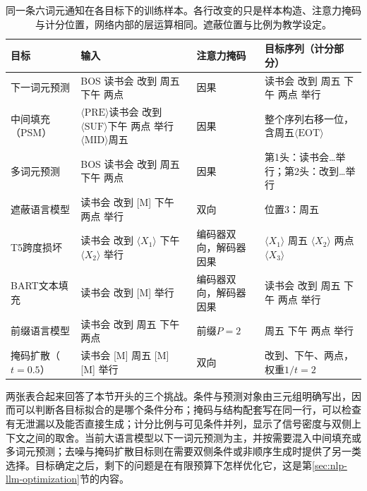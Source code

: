 \begin{table}[htbp]
 \small
 \begin{tabularx}{\linewidth}{@{}p{20mm}p{55mm}p{22mm}X@{}}
  \toprule
  目标 & 输入 & 注意力掩码 & 目标序列（计分部分）\\
  \midrule
  下一词元预测 & BOS 读书会 改到 周五 下午 两点 & 因果 & 读书会 改到 周五 下午 两点 举行\\
  中间填充（PSM） & $\langle\mathrm{PRE}\rangle$读书会 改到$\langle\mathrm{SUF}\rangle$下午 两点 举行$\langle\mathrm{MID}\rangle$周五 & 因果 & 整个序列右移一位，含周五$\langle\mathrm{EOT}\rangle$\\
  多词元预测 & BOS 读书会 改到 周五 下午 两点 & 因果 & 第1头：读书会…举行；第2头：改到…举行\\
  遮蔽语言模型 & 读书会 改到 [M] 下午 两点 举行 & 双向 & 位置3：周五\\
  T5跨度损坏 & 读书会 改到 $\langle X_1\rangle$ 下午 $\langle X_2\rangle$ 举行 & 编码器双向，解码器因果 & $\langle X_1\rangle$ 周五 $\langle X_2\rangle$ 两点 $\langle X_3\rangle$\\
  BART文本填充 & 读书会 改到 [M] 举行 & 编码器双向，解码器因果 & 读书会 改到 周五 下午 两点 举行\\
  前缀语言模型 & 读书会 改到 周五 下午 两点 & 前缀$P=2$ & 周五 下午 两点 举行\\
  掩码扩散（$t=0.5$） & 读书会 [M] 周五 [M] [M] 举行 & 双向 & 改到、下午、两点，权重$1/t=2$\\
  \bottomrule
 \end{tabularx}
 \caption{同一条六词元通知在各目标下的训练样本。各行改变的只是样本构造、注意力掩码与计分位置，网络内部的层运算相同。遮蔽位置与比例为教学设定。}
 \label{tab:nlp-llm-objective-notice}
\end{table}

两张表合起来回答了本节开头的三个挑战。条件与预测对象由三元组明确写出，因而可以判断各目标拟合的是哪个条件分布；掩码与结构配套写在同一行，可以检查有无泄漏以及能否直接生成；计分比例与可见条件并列，显示了信号密度与双侧上下文之间的取舍。当前大语言模型以下一词元预测为主，并按需要混入中间填充或多词元预测；去噪与掩码扩散目标则在需要双侧条件或非顺序生成时提供了另一类选择。目标确定之后，剩下的问题是在有限预算下怎样优化它，这是第\ref{sec:nlp-llm-optimization}节的内容。
